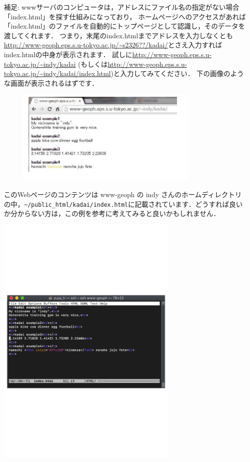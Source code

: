 \documentclass{jarticle}
\begin{document}
補足: wwwサーバのコンピュータは，アドレスにファイル名の指定がない場合「index.html」を探す仕組みになっており，
ホームページへのアクセスがあれば「index.html」のファイルを自動的にトップページとして認識し，そのデータを渡してくれます．
つまり，末尾のindex.htmlまでアドレスを入力しなくとも\url{http://www-geoph.eps.s.u-tokyo.ac.jp/~s2326??/kadai/}とさえ入力すればindex.htmlの中身が表示されます． 
試しに\url{http://www-geoph.eps.s.u-tokyo.ac.jp/~indy/kadai}
 (もしくは\url{http://www-geoph.eps.s.u-tokyo.ac.jp/~indy/kadai/index.html})と入力してみてください．
 下の画像のような画面が表示されるはずです．
\begin{figure}[htbp]
 \begin{center}
  \includegraphics[width=90mm,pagebox=cropbox,clip]{fig/2.pdf}
 \end{center}
 \label{fig:one}
\end{figure}

このWebページのコンテンツは www-geoph の indy さんのホームディレクトリの中，\verb|~/public_html/kadai/index.html|に記載されています．どうすれば良いか分からない方は，この例を参考に考えてみると良いかもしれません．
\begin{center}
 \includegraphics[width=90mm,pagebox=cropbox,clip]{fig/indy.pdf}
\end{center}
\end{document}
